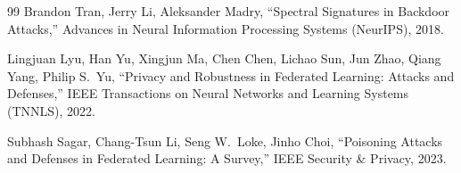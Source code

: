\documentclass[a4j, dvipdfmx]{jsarticle}  %
\begin{document}
\begin{thebibliography}{99}
Brandon Tran, Jerry Li, Aleksander Madry,
``Spectral Signatures in Backdoor Attacks,''
Advances in Neural Information Processing Systems (NeurIPS), 2018.

Lingjuan Lyu, Han Yu, Xingjun Ma, Chen Chen, Lichao Sun, Jun Zhao, Qiang Yang, Philip S.~Yu,
``Privacy and Robustness in Federated Learning: Attacks and Defenses,''
IEEE Transactions on Neural Networks and Learning Systems (TNNLS), 2022.

Subhash Sagar, Chang-Tsun Li, Seng W.~Loke, Jinho Choi,
``Poisoning Attacks and Defenses in Federated Learning: A Survey,''
IEEE Security \& Privacy, 2023.

\end{thebibliography}
\end{document}
